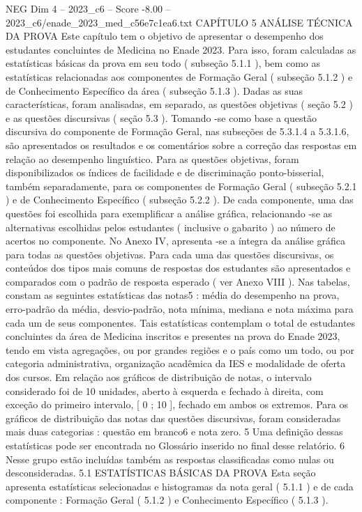 \begin{textsample}{NEG Dim 4 – 2023\_c6 – Score -8.00 – 2023\_c6/enade\_2023\_med\_c56e7c1ea6.txt}  \label{ex:f4_neg_018}
CAPÍTULO 5 ANÁLISE TÉCNICA DA PROVA Este capítulo tem o objetivo de apresentar o desempenho dos estudantes concluintes de Medicina no Enade 2023.
Para isso, foram calculadas as estatísticas básicas da prova em seu todo ( subseção 5.1.1 ), bem como as estatísticas relacionadas aos componentes de Formação Geral ( subseção 5.1.2 ) e de Conhecimento Específico da área ( subseção 5.1.3 ).
Dadas as suas características, foram analisadas, em separado, as questões objetivas ( seção 5.2 ) e as questões discursivas ( seção 5.3 ).
Tomando -se como base a questão discursiva do componente de Formação Geral, nas subseções de 5.3.1.4 a 5.3.1.6, são apresentados os resultados e os comentários sobre a correção das respostas em relação ao desempenho linguístico.
Para as questões objetivas, foram disponibilizados os índices de facilidade e de discriminação ponto-bisserial, também separadamente, para os componentes de Formação Geral ( subseção 5.2.1 ) e de Conhecimento Específico ( subseção 5.2.2 ).
De cada componente, uma das questões foi escolhida para exemplificar a análise gráfica, relacionando -se as alternativas escolhidas pelos estudantes ( inclusive o gabarito ) ao número de acertos no componente.
No Anexo IV, apresenta -se a íntegra da análise gráfica para todas as questões objetivas.
Para cada uma das questões discursivas, os conteúdos dos tipos mais comuns de respostas dos estudantes são apresentados e comparados com o padrão de resposta esperado ( ver Anexo VIII ).
Nas tabelas, constam as seguintes estatísticas das notas5 : média do desempenho na prova, erro-padrão da média, desvio-padrão, nota mínima, mediana e nota máxima para cada um de seus componentes.
Tais estatísticas contemplam o total de estudantes concluintes da área de Medicina inscritos e presentes na prova do Enade 2023, tendo em vista agregações, ou por grandes regiões e o país como um todo, ou por categoria administrativa, organização acadêmica da IES e modalidade de oferta dos cursos.
Em relação aos gráficos de distribuição de notas, o intervalo considerado foi de 10 unidades, aberto à esquerda e fechado à direita, com exceção do primeiro intervalo, [ 0 ; 10 ], fechado em ambos os extremos.
Para os gráficos de distribuição das notas das questões discursivas, foram consideradas mais duas categorias : questão em branco6 e nota zero. 5 Uma definição dessas estatísticas pode ser encontrada no Glossário inserido no final desse relatório. 6 Nesse grupo estão incluídas também as respostas classificadas como nulas ou desconsideradas. 5.1 ESTATÍSTICAS BÁSICAS DA PROVA Esta seção apresenta estatísticas selecionadas e histogramas da nota geral ( 5.1.1 ) e de cada componente : Formação Geral ( 5.1.2 ) e Conhecimento Específico ( 5.1.3 ).

\end{textsample}

